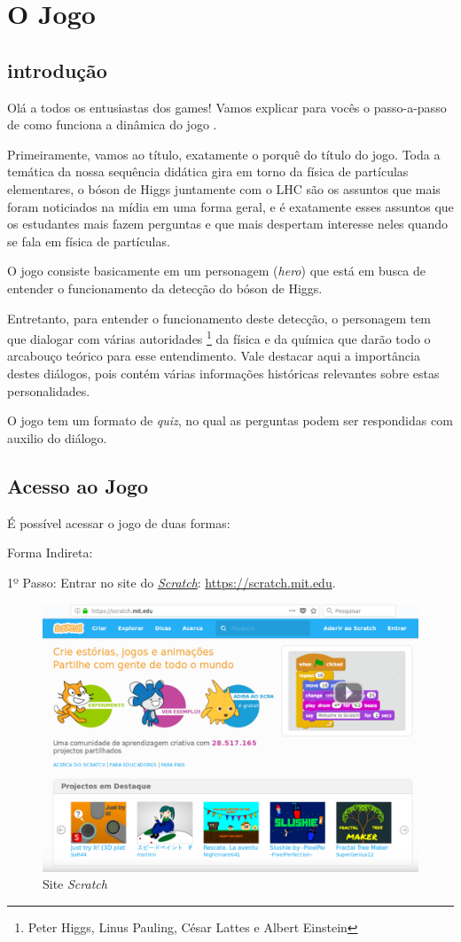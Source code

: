 \documentclass[12pt,fleqn]{book} %
\begin{document}
\chapter{O Jogo }
\section{introdução}
Olá a todos os entusiastas dos games! Vamos explicar para vocês o passo-a-passo de como funciona a dinâmica do jogo .

Primeiramente, vamos ao título, exatamente o porquê do título do jogo. Toda a temática da nossa sequência didática gira em torno da física de partículas elementares, o bóson de Higgs juntamente com o LHC são os assuntos que mais foram noticiados na mídia em uma forma geral, e é exatamente esses assuntos que os estudantes mais fazem perguntas e que mais despertam interesse neles quando se fala em física de partículas.

O jogo consiste basicamente em um personagem (\textit{hero}) que está em busca de entender o funcionamento da detecção do bóson de Higgs.

Entretanto, para entender o funcionamento deste detecção, o personagem tem que dialogar com várias autoridades \footnote{Peter Higgs, Linus Pauling, César Lattes e Albert Einstein} da física e da química que darão todo o arcabouço teórico para esse entendimento. Vale destacar aqui a importância destes diálogos, pois contém várias informações históricas relevantes sobre estas personalidades. 

O jogo tem um formato de \textit{quiz}, no qual as perguntas podem ser respondidas com auxilio do diálogo.

\section{Acesso ao Jogo}
É possível acessar o jogo de duas formas: 

Forma Indireta:

1º Passo: Entrar no site do \href{https://scratch.mit.edu}{\textit{Scratch}}: \url{https://scratch.mit.edu}.

\begin{figure}[ht]
	\centering
	\includegraphics[width=0.7 \textwidth]{Produto/site_scratch}
	\caption{Site \textit{Scratch}}
	\label{fig:app_a:sitescratch}
\end{figure}
\end{document}
